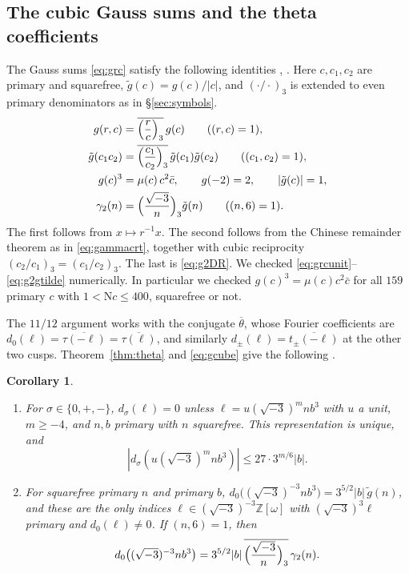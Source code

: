 \documentclass[11pt]{article}
\numberwithin{equation}{section}
\newcommand{\N}{\mathrm N}
\newcommand{\OO}{\mathbb Z[\omega]}
\newtheorem{corollary}[theorem]{Corollary}
\theoremstyle{definition}
\theoremstyle{remark}
\begin{document}
\subsection{The cubic Gauss sums and the theta coefficients}\label{sec:thetacoef}
The Gauss sums \eqref{eq:grc} satisfy the following identities \cite[\S2]{DR}, \cite{QRH}. Here $c,c_1,c_2$ are
primary and squarefree, $\tilde g(c)=g(c)/|c|$, and $(\cdot/\cdot)_3$ is extended to even primary
denominators as in \S\ref{sec:symbols}.
\begin{align}
 g(r,c)&=\overline{\Bigl(\frac rc\Bigr)_3}\,g(c)\qquad((r,c)=1),\label{eq:grcunit}\\
 \tilde g(c_1c_2)&=\overline{\Bigl(\frac{c_1}{c_2}\Bigr)_3}\,\tilde g(c_1)\tilde g(c_2)\qquad((c_1,c_2)=1),\label{eq:twistmult}\\
 g(c)^3&=\mu(c)\,c^2\bar c,\qquad g(-2)=2,\qquad|\tilde g(c)|=1,\label{eq:gcube}\\
 \gamma_2(n)&=\Bigl(\frac{\sqrt{-3}}n\Bigr)_3\tilde g(n)\qquad((n,6)=1).\label{eq:g2gtilde}
\end{align}
The first follows from $x\mapsto r^{-1}x$. The second follows from the Chinese remainder theorem as in
\eqref{eq:gammacrt}, together with cubic reciprocity $(c_2/c_1)_3=(c_1/c_2)_3$. The last is \eqref{eq:g2DR}. We checked
\eqref{eq:grcunit}--\eqref{eq:g2gtilde} numerically. In particular we checked $g(c)^3=\mu(c)c^2\bar c$ for all $159$
primary $c$ with $1<\N c\le400$, squarefree or not.

The $11/12$ argument works with the conjugate $\overline\theta$, whose Fourier coefficients are
$d_0(\ell)=\overline{\tau(-\ell)}=\overline{\tau(\ell)}$, and similarly $d_\pm(\ell)=\overline{t_\pm(-\ell)}$ at the other
two cusps. Theorem~\ref{thm:theta} and \eqref{eq:gcube} give the following \cite[\S2 and Lemma~6.4]{QRH}.

\begin{corollary}\label{cor:thetacoef}
\begin{enumerate}
\item For $\sigma\in\{0,+,-\}$, $d_\sigma(\ell)=0$ unless $\ell=u(\sqrt{-3})^mnb^3$ with $u$ a unit, $m\ge-4$, and $n,b$
primary with $n$ squarefree. This representation is unique, and
\begin{equation}\label{eq:dbound}
 |d_\sigma(u(\sqrt{-3})^mnb^3)|\le27\cdot3^{m/6}|b| .
\end{equation}
\item For squarefree primary $n$ and primary $b$, $d_0\bigl((\sqrt{-3})^{-3}nb^3\bigr)=3^{5/2}|b|\,\tilde g(n)$, and these are
the only indices $\ell\in(\sqrt{-3})^{-3}\OO$ with $(\sqrt{-3})^3\ell$ primary and $d_0(\ell)\ne0$. If $(n,6)=1$, then
\begin{equation}\label{eq:d0}
 d_0\bigl((\sqrt{-3})^{-3}nb^3\bigr)=3^{5/2}|b|\,\overline{\Bigl(\frac{\sqrt{-3}}n\Bigr)_3}\,\gamma_2(n).
\end{equation}
\end{enumerate}
\end{corollary}
\end{document}

